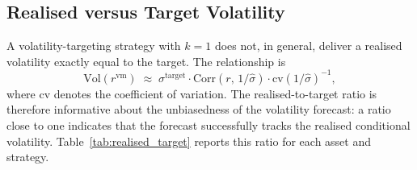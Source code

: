 \documentclass[12pt, a4paper]{article}
\newcommand{\stgt}{\sigma^{\mathrm{target}}}
\newcommand{\shat}{\hat{\sigma}}
\begin{document}
\subsection{Realised versus Target Volatility}
\label{sec:diag_target}

A volatility-targeting strategy with $k=1$ does not, in general, deliver a realised
volatility exactly equal to the target. The relationship is
\begin{equation}
  \mathrm{Vol}\!\left(r^{\mathrm{vm}}\right)
  \;\approx\;
  \stgt \cdot \mathrm{Corr}\!\left( r,\,1/\shat \right)
  \cdot
  \mathrm{cv}\!\left( 1/\shat \right)^{-1},
\end{equation}
where $\mathrm{cv}$ denotes the coefficient of variation. The realised-to-target ratio is
therefore informative about the unbiasedness of the volatility forecast: a ratio close to
one indicates that the forecast successfully tracks the realised conditional volatility.
Table~\ref{tab:realised_target} reports this ratio for each asset and strategy.
\end{document}
